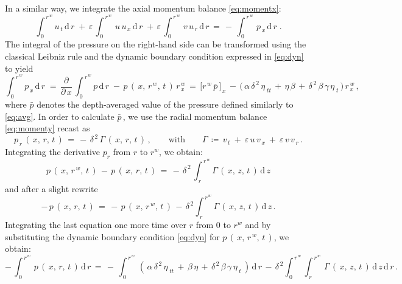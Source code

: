 \documentclass[alpha-refs, 12pt]{wiley-article}
\newcommand{\ud}{\mathrm{d}}
\newcommand{\eps}{\varepsilon}
\begin{document}
In a similar way, we integrate the axial momentum balance \cref{eq:momentx}:
\begin{equation}\label{eq:ut}
  \int_{\,0}^{\,r^{\,w}}u_{\,t}\,\ud\,r\;+\,\eps\, \int_{\,0}^{\,r^{\,w}}\,u\,u_{\,x}\,\ud\,r\;+\,\eps\, \int_{\,0}^{\,r^{\,w}}\,v\,u_{\,r}\,\ud\,r\,=\, -\, \int_{\,0}^{\,r^{\,w}}\,p_{\,x}\,\ud\,r\;.
\end{equation}
The integral of the pressure on the right-hand side can be transformed using the classical Leibniz rule and the dynamic boundary condition expressed in \cref{eq:dyn} to yield
\begin{equation}\label{eq:px}
  \int_{\,0}^{\,r^{\,w}}p_{\,x}\,\ud\,r\;=\,\frac{\partial}{\partial\,x}\,\int_{\,0}^{\,r^{\,w}}p\,\ud\,r\; -\,p\,(\,x,\,r^{\,w},\,t\,)\,r^{\,w}_{\,x}\,=\,\bigl[r^{\,w}\,\bar{p}\,\bigr]_{\,x}\,-\,\bigl(\,\alpha\,\delta^{\,2}\,\eta_{\;tt}\,+\,\eta\,\beta\,+\,\delta^{\,2}\,\beta\,\gamma\,\eta_{\;t}\,\bigr)\,r^{\,w}_{\,x}\,,
\end{equation}
where $\bar{p}$ denotes the depth-averaged value of the pressure defined similarly to \cref{eq:avg}. In order to calculate $\bar{p}\,$, we use the radial momentum balance \cref{eq:momenty} recast as
\begin{equation*}
  p_{\,r}\,(\,x,\,r,\,t\,)\,=\,-\,\delta^{\,2}\,\Gamma\,(\,x,\,r,\,t\,)\,, \qquad \text{with} \qquad \Gamma\,\coloneqq\, v_{\,t}\ +\ \eps\,u\,v_{\,x}\ +\ \eps\,v\,v_{\,r}\,.
\end{equation*}
Integrating the derivative $p_r$ from $r$ to $r^w$, we obtain:
\begin{equation*}
  p\,(\,x,\,r^{\,w},\,t\,)\,-\,p\,(\,x,\,r,\,t\,)\,=\,-\,\delta^{\,2}\,\displaystyle \int_{\,r}^{\,r^{\,w}}\Gamma\,(\,x,\,z,\,t\,)\,\mathrm{d}\,z
\end{equation*}
and after a slight rewrite
\begin{equation*}
  -\,p\,(\,x,\,r,\,t\,)\,=\,-\,p\,(\,x,\,r^{\,w},\,t\,)\,-\,\delta^{\,2} \displaystyle \int_{\,r}^{\,r^{\,w}}\Gamma\,(\,x,\,z,\,t\,)\,\mathrm{d}\,z\,.
\end{equation*}
Integrating the last equation one more time over $r$ from $0$ to $r^w$ and by substituting the dynamic boundary condition \eqref{eq:dyn} for $p\,(\,x,\,r^{\,w},\,t\,)$, we obtain:
\begin{equation*}
  -\,\int_{\,0}^{\,r^{\,w}}\,p\,(\,x,\,r,\,t\,)\,\mathrm{d}\,r\,=\,-\,
\displaystyle\int_{\,0}^{\,r^{\,w}}\,(\,\alpha\,\delta^{\,2} \,\eta_{\;tt}\,+\,\beta\,\eta\,+\,\delta^{\,2}\,\beta\,\gamma\,\eta_{\;t}\,)\,\mathrm{d}\,r\,-\,\delta^{\,2}\displaystyle \int_{\,0}^{\,r^{\,w}}\displaystyle \int_{\,r}^{\,r^{\,w}}\,\Gamma\,(\,x,\,z,\,t\,)\,\mathrm{d}\,z\,\mathrm{d}\,r\,.
\end{equation*}
\end{document}

